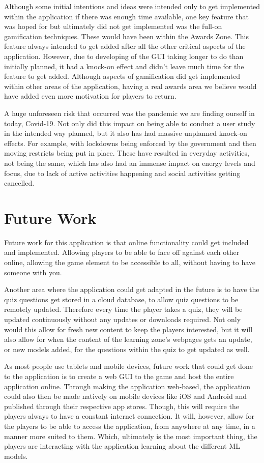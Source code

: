 		Although some initial intentions and ideas were intended only to get implemented within the application if there was enough time available, one key feature that was hoped for but ultimately did not get implemented was the full-on gamification techniques. These would have been within the Awards Zone. This feature always intended to get added after all the other critical aspects of the application. However, due to developing of the GUI taking longer to do than initially planned, it had a knock-on effect and didn't leave much time for the feature to get added. Although aspects of gamification did get implemented within other areas of the application, having a real awards area we believe would have added even more motivation for players to return. 

		A huge unforeseen risk that occurred was the pandemic we are finding ourself in today, Covid-19. Not only did this impact on being able to conduct a user study in the intended way planned, but it also has had massive unplanned knock-on effects. For example, with lockdowns being enforced by the government and then moving restricts being put in place. These have resulted in everyday activities, not being the same, which has also had an immense impact on energy levels and focus, due to lack of active activities happening and social activities getting cancelled.
		
	\section{Future Work} %
		Future work for this application is that online functionality could get included and implemented. Allowing players to be able to face off against each other online, allowing the game element to be accessible to all, without having to have someone with you.
		
		Another area where the application could get adapted in the future is to have the quiz questions get stored in a cloud database, to allow quiz questions to be remotely updated. Therefore every time the player takes a quiz, they will be updated continuously without any updates or downloads required. Not only would this allow for fresh new content to keep the players interested, but it will also allow for when the content of the learning zone's webpages gets an update, or new models added, for the questions within the quiz to get updated as well.
		
		As most people use tablets and mobile devices, future work that could get done to the application is to create a web GUI to the game and host the entire application online. Through making the application web-based, the application could also then be made natively on mobile devices like iOS and Android and published through their respective app stores. Though, this will require the players always to have a constant internet connection. It will, however, allow for the players to be able to access the application, from anywhere at any time, in a manner more suited to them. Which, ultimately is the most important thing, the players are interacting with the application learning about the different ML models.
		
